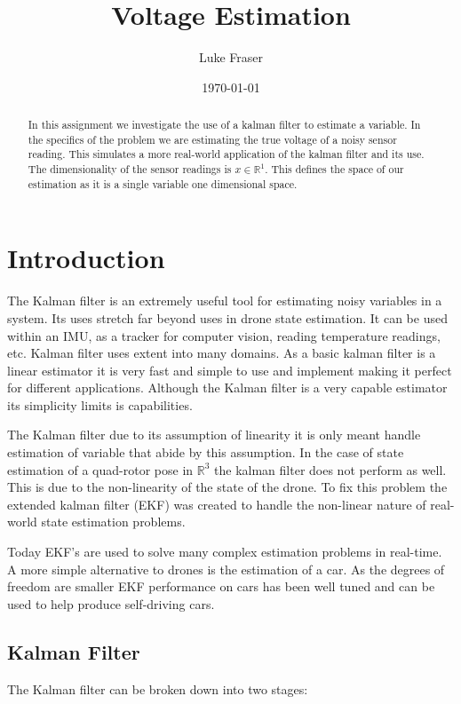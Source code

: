 \documentclass[letter]{IEEEtran}
\title{Voltage Estimation}
\date{\today}
\begin{document}
\author{Luke Fraser}
\maketitle
\begin{abstract}
In this assignment we investigate the use of a kalman filter to estimate a variable. In the specifics of the problem we are estimating the true voltage of a noisy sensor reading. This simulates a more real-world application of the kalman filter and its use. The dimensionality of the sensor readings is $x \in \mathbb{R}^1$. This defines the space of our estimation as it is a single variable one dimensional space.
\end{abstract}

\section{Introduction}
The Kalman filter is an extremely useful tool for estimating noisy variables in a system. Its uses stretch far beyond uses in drone state estimation. It can be used within an IMU, as a tracker for computer vision, reading temperature readings, etc. Kalman filter uses extent into many domains. As a basic kalman filter is a linear estimator it is very fast and simple to use and implement making it perfect for different applications. Although the Kalman filter is a very capable estimator its simplicity limits is capabilities.

The Kalman filter due to its assumption of linearity it is only meant handle estimation of variable that abide by this assumption. In the case of state estimation of a quad-rotor pose in $\mathbb{R}^3$ the kalman filter does not perform as well. This is due to the non-linearity of the state of the drone. To fix this problem the extended kalman filter (EKF) was created to handle the non-linear nature of real-world state estimation problems.

Today EKF's are used to solve many complex estimation problems in real-time. A more simple alternative to drones is the estimation of a car. As the degrees of freedom are smaller EKF performance on cars has been well tuned and can be used to help produce self-driving cars.

\subsection{Kalman Filter}
The Kalman filter can be broken down into two stages:
\end{document}
